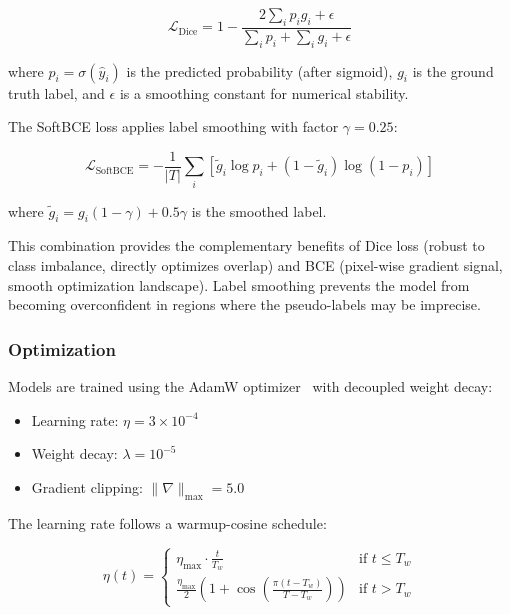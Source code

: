 \begin{equation}
\mathcal{L}_{\text{Dice}} = 1 - \frac{2 \sum_i p_i g_i + \epsilon}{\sum_i p_i + \sum_i g_i + \epsilon}
\end{equation}

\noindent where $p_i = \sigma(\hat{y}_i)$ is the predicted probability (after sigmoid), $g_i$ is the ground truth label, and $\epsilon$ is a smoothing constant for numerical stability.

The SoftBCE loss applies label smoothing with factor $\gamma = 0.25$:

\begin{equation}
\mathcal{L}_{\text{SoftBCE}} = -\frac{1}{|T|}\sum_i \left[\tilde{g}_i \log p_i + (1 - \tilde{g}_i) \log(1 - p_i)\right]
\end{equation}

\noindent where $\tilde{g}_i = g_i(1 - \gamma) + 0.5\gamma$ is the smoothed label.

This combination provides the complementary benefits of Dice loss (robust to class imbalance, directly optimizes overlap) and BCE (pixel-wise gradient signal, smooth optimization landscape). Label smoothing prevents the model from becoming overconfident in regions where the pseudo-labels may be imprecise.

\subsubsection{Optimization}

Models are trained using the AdamW optimizer~\cite{loshchilov2019adamw} with decoupled weight decay:

\begin{itemize}
    \item Learning rate: $\eta = 3 \times 10^{-4}$
    \item Weight decay: $\lambda = 10^{-5}$
    \item Gradient clipping: $\|\nabla\|_{\max} = 5.0$
\end{itemize}

The learning rate follows a warmup-cosine schedule:

\begin{equation}
\eta(t) = \begin{cases}
\eta_{\max} \cdot \frac{t}{T_w} & \text{if } t \leq T_w \\[3pt]
\frac{\eta_{\max}}{2} \left(1 + \cos\!\left(\frac{\pi (t - T_w)}{T - T_w}\right)\right) & \text{if } t > T_w
\end{cases}
\end{equation}

